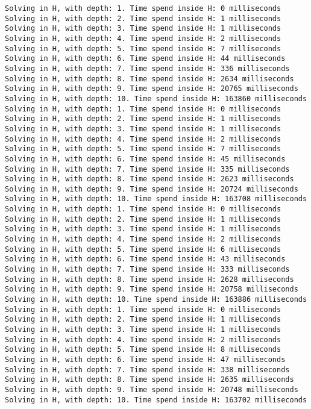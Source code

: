 \begin{lstlisting}[breaklines=true, basicstyle=\ttfamily\footnotesize]
Solving in H, with depth: 1. Time spend inside H: 0 milliseconds
Solving in H, with depth: 2. Time spend inside H: 1 milliseconds
Solving in H, with depth: 3. Time spend inside H: 1 milliseconds
Solving in H, with depth: 4. Time spend inside H: 2 milliseconds
Solving in H, with depth: 5. Time spend inside H: 7 milliseconds
Solving in H, with depth: 6. Time spend inside H: 44 milliseconds
Solving in H, with depth: 7. Time spend inside H: 336 milliseconds
Solving in H, with depth: 8. Time spend inside H: 2634 milliseconds
Solving in H, with depth: 9. Time spend inside H: 20765 milliseconds
Solving in H, with depth: 10. Time spend inside H: 163860 milliseconds
Solving in H, with depth: 1. Time spend inside H: 0 milliseconds
Solving in H, with depth: 2. Time spend inside H: 1 milliseconds
Solving in H, with depth: 3. Time spend inside H: 1 milliseconds
Solving in H, with depth: 4. Time spend inside H: 2 milliseconds
Solving in H, with depth: 5. Time spend inside H: 7 milliseconds
Solving in H, with depth: 6. Time spend inside H: 45 milliseconds
Solving in H, with depth: 7. Time spend inside H: 335 milliseconds
Solving in H, with depth: 8. Time spend inside H: 2623 milliseconds
Solving in H, with depth: 9. Time spend inside H: 20724 milliseconds
Solving in H, with depth: 10. Time spend inside H: 163708 milliseconds
Solving in H, with depth: 1. Time spend inside H: 0 milliseconds
Solving in H, with depth: 2. Time spend inside H: 1 milliseconds
Solving in H, with depth: 3. Time spend inside H: 1 milliseconds
Solving in H, with depth: 4. Time spend inside H: 2 milliseconds
Solving in H, with depth: 5. Time spend inside H: 6 milliseconds
Solving in H, with depth: 6. Time spend inside H: 43 milliseconds
Solving in H, with depth: 7. Time spend inside H: 333 milliseconds
Solving in H, with depth: 8. Time spend inside H: 2628 milliseconds
Solving in H, with depth: 9. Time spend inside H: 20758 milliseconds
Solving in H, with depth: 10. Time spend inside H: 163886 milliseconds
Solving in H, with depth: 1. Time spend inside H: 0 milliseconds
Solving in H, with depth: 2. Time spend inside H: 1 milliseconds
Solving in H, with depth: 3. Time spend inside H: 1 milliseconds
Solving in H, with depth: 4. Time spend inside H: 2 milliseconds
Solving in H, with depth: 5. Time spend inside H: 8 milliseconds
Solving in H, with depth: 6. Time spend inside H: 47 milliseconds
Solving in H, with depth: 7. Time spend inside H: 338 milliseconds
Solving in H, with depth: 8. Time spend inside H: 2635 milliseconds
Solving in H, with depth: 9. Time spend inside H: 20748 milliseconds
Solving in H, with depth: 10. Time spend inside H: 163702 milliseconds

\end{lstlisting}
